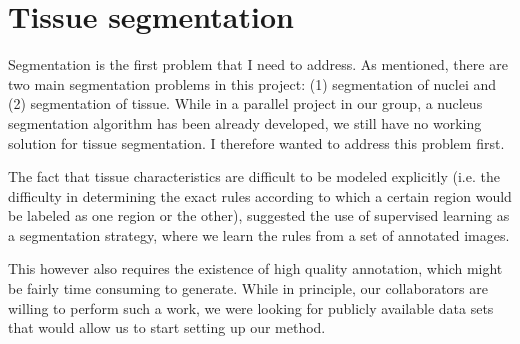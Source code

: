 \documentclass[a4paper,10pt]{article}
\begin{document}

\section{Tissue segmentation}

Segmentation is the first problem that I need to address. As
mentioned, there are two main segmentation problems in this project:
(1) segmentation of nuclei and (2) segmentation of tissue. While in a
parallel project in our group, a nucleus segmentation algorithm has
been already developed, we still have no working solution for tissue
segmentation. I therefore wanted to address this problem first. 

The fact that tissue characteristics are difficult to be modeled
explicitly (i.e. the difficulty in determining the exact rules
according to which a certain region would be labeled as one region or
the other), suggested the use of supervised learning as a segmentation
strategy, where we learn the rules from a set of annotated images. 

This however also requires the existence of high quality annotation,
which might be fairly time consuming to generate. While in principle,
our collaborators are willing to perform such a work, we were looking
for publicly available data sets that would allow us to start setting
up our method. 
\end{document}
